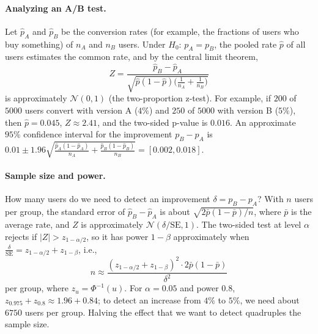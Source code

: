 \paragraph{Analyzing an A/B test.} Let $\hat p_A$ and $\hat p_B$ be the conversion rates (for example, the fractions of users who buy something) of $n_A$ and $n_B$ users. Under $H_0$: $p_A = p_B$, the pooled rate $\hat p$ of all users estimates the common rate, and by the central limit theorem,
\[Z = \frac{\hat p_B - \hat p_A}{\sqrt{\hat p(1 - \hat p)\big(\frac{1}{n_A} + \frac{1}{n_B}\big)}}\]
is approximately $\mathcal{N}(0, 1)$ (the two-proportion z-test). For example, if $200$ of $5000$ users convert with version A ($4\%$) and $250$ of $5000$ with version B ($5\%$), then $\hat p = 0.045$, $Z \approx 2.41$, and the two-sided p-value is $0.016$. An approximate $95\%$ confidence interval for the improvement $p_B - p_A$ is $0.01 \pm 1.96\sqrt{\frac{\hat p_A(1 - \hat p_A)}{n_A} + \frac{\hat p_B(1 - \hat p_B)}{n_B}} = [0.002, 0.018]$.

\paragraph{Sample size and power.} How many users do we need to detect an improvement $\delta = p_B - p_A$? With $n$ users per group, the standard error of $\hat p_B - \hat p_A$ is about $\sqrt{2\bar p(1 - \bar p)/n}$, where $\bar p$ is the average rate, and $Z$ is approximately $\mathcal{N}(\delta/\mathrm{SE}, 1)$. The two-sided test at level $\alpha$ rejects if $|Z| > z_{1-\alpha/2}$, so it has power $1 - \beta$ approximately when $\frac{\delta}{\mathrm{SE}} = z_{1-\alpha/2} + z_{1-\beta}$, i.e.,
\[n \approx \frac{(z_{1-\alpha/2} + z_{1-\beta})^2 \cdot 2\bar p(1 - \bar p)}{\delta^2}\]
per group, where $z_u = \Phi^{-1}(u)$. For $\alpha = 0.05$ and power $0.8$, $z_{0.975} + z_{0.8} \approx 1.96 + 0.84$; to detect an increase from $4\%$ to $5\%$, we need about $6750$ users per group. Halving the effect that we want to detect quadruples the sample size.

